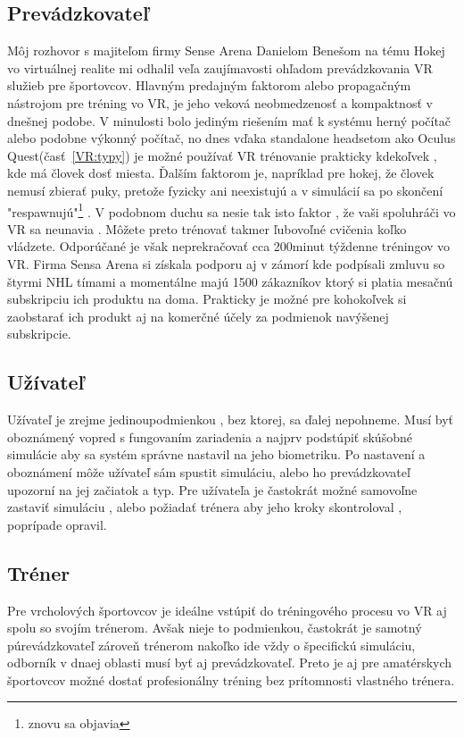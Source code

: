 \documentclass[10pt,twoside,slovak,a4paper]{article}										%
\begin{document}
\subsection{Prevádzkovateľ}\label{PR:boss}
Môj rozhovor s majiteľom firmy Sense Arena Danielom Benešom na tému Hokej vo virtuálnej realite mi odhalil veľa zaujímavosti ohľadom prevádzkovania VR služieb pre športovcov. Hlavným predajným faktorom alebo propagačným nástrojom pre tréning vo VR, je jeho veková neobmedzenosť a kompaktnosť v dnešnej podobe. V minulosti bolo jediným riešením mať k systému herný počítač alebo podobne výkonný počítač, no dnes vďaka standalone headsetom ako Oculus Quest(časť~\ref{VR:typy}) je možné používať VR trénovanie prakticky kdekoľvek , kde má človek dosť miesta. 
Ďalším faktorom je, napríklad pre hokej, že človek nemusí zbierať puky, pretože fyzicky ani neexistujú a v simulácií sa po skončení "respawnujú"\footnote{znovu sa objavia} . V podobnom duchu sa nesie tak isto faktor , že vaši spoluhráči vo VR sa neunavia . Môžete preto trénovať takmer ľubovoľné cvičenia koľko vládzete. Odporúčané je však neprekračovať cca 200minut týždenne tréningov vo VR. Firma Sensa Arena si získala podporu aj v zámorí kde podpísali zmluvu so štyrmi NHL tímami a momentálne majú 1500 zákazníkov ktorý si platia mesačnú subskripciu ich produktu na doma. Prakticky je možné pre kohokoľvek si zaobstarať ich produkt aj na komerčné účely za podmienok navýšenej subskripcie.

\subsection {Užívateľ} \label{PR:user}
Užívateľ je zrejme jedinoupodmienkou , bez ktorej, sa ďalej nepohneme. Musí byť oboznámený vopred s fungovaním zariadenia a najprv podstúpiť skúšobné simulácie aby sa systém správne nastavil na jeho biometriku. Po nastavení a oboznámení môže užívateľ sám spustit simuláciu, alebo ho prevádzkovateľ upozorní na jej začiatok a typ. Pre užívateľa je častokrát možné samovoľne zastaviť simuláciu , alebo požiadať trénera aby jeho kroky skontroloval , poprípade opravil.

\subsection {Tréner} \label{PR:trendo}
Pre vrcholových športovcov je ideálne vstúpiť do tréningového procesu vo VR aj spolu so svojím trénerom. Avšak nieje to podmienkou, častokrát je samotný púrevádzkovateľ zároveň trénerom nakoľko ide vždy o špecifickú simuláciu, odborník v dnaej oblasti musí byť aj prevádzkovateľ. Preto je aj pre amatérskych športovcov možné dostať profesionálny tréning bez prítomnosti vlastného trénera.
\end{document}
